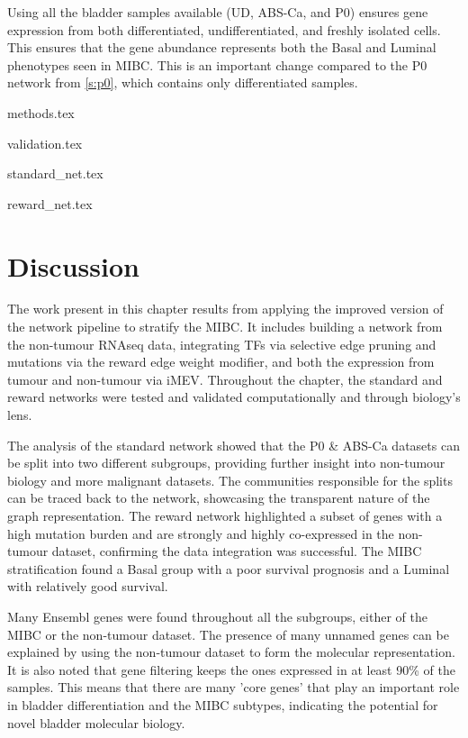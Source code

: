 Using all the bladder samples available (UD, ABS-Ca, and P0) ensures gene expression from both differentiated, undifferentiated, and freshly isolated cells. This ensures that the gene abundance represents both the Basal and Luminal phenotypes seen in MIBC. This is an important change compared to the P0 network from \cref{s:p0}, which contains only differentiated samples.


{methods.tex}

{validation.tex}

{standard_net.tex}

{reward_net.tex}

\section{Discussion}

The work present in this chapter results from applying the improved version of the network pipeline to stratify the MIBC. It includes building a network from the non-tumour RNAseq data, integrating TFs via selective edge pruning and mutations via the reward edge weight modifier, and both the expression from tumour and non-tumour via iMEV. Throughout the chapter, the standard and reward networks were tested and validated computationally and through biology's lens. 

The analysis of the standard network showed that the P0 \& ABS-Ca datasets can be split into two different subgroups, providing further insight into non-tumour biology and more malignant datasets. The communities responsible for the splits can be traced back to the network, showcasing the transparent nature of the graph representation. The reward network highlighted a subset of genes with a high mutation burden and are strongly and highly co-expressed in the non-tumour dataset, confirming the data integration was successful. The MIBC stratification found a Basal group with a poor survival prognosis and a Luminal with relatively good survival.

Many Ensembl genes were found throughout all the subgroups, either of the MIBC or the non-tumour dataset. The presence of many unnamed genes can be explained by using the non-tumour dataset to form the molecular representation. It is also noted that gene filtering keeps the ones expressed in at least 90\% of the samples. This means that there are many 'core genes' that play an important role in bladder differentiation and the MIBC subtypes, indicating the potential for novel bladder molecular biology. 

